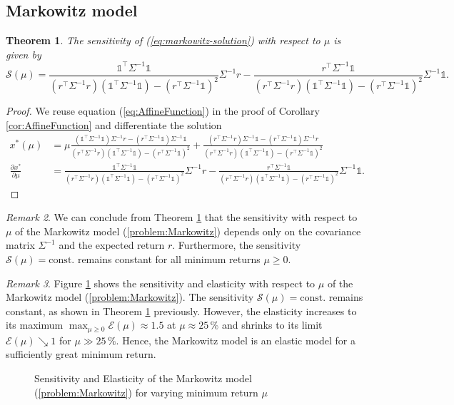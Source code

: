 \documentclass[a4paper, english, 11pt, onecolumn, oneside, final]{article}
\numberwithin{equation}{section}   %
\newcommand{\one}{\mathds 1}
\newcommand{\precision}{\Sigma^{-1}}
\newcommand{\A}{r^\top\Sigma^{-1} r}
\newcommand{\B}{r^\top\Sigma^{-1}\one}
\newcommand{\C}{\one^\top\Sigma^{-1}\one}
\newcommand{\D}{(\A)(\C)-(\B)^2}
\theoremstyle{plain}
\newtheorem{theorem}             {Theorem}[section]
\theoremstyle{definition}
\theoremstyle{remark}
\newtheorem{remark}     [theorem]{Remark}
\begin{document}
\subsection{Markowitz model}
\begin{theorem}
\label{thm:MarkowitzSensitivity}
    The sensitivity of (\ref{eq:markowitz-solution}) with respect to $\mu$ is given by
    \begin{equation*}
        \mathcal{S}(\mu) = \frac{\C}{\D}\precision r - \frac{\B}{\D}\precision\one.
    \end{equation*}
\end{theorem}
\begin{proof}
    We reuse equation (\ref{eq:AffineFunction}) in the proof of Corollary \ref{cor:AffineFunction} and differentiate the solution
    \begin{equation*}
        \begin{aligned}
            x^*(\mu) 
            &= \mu\frac{(\C)\precision r - (\B)\precision\one}{\D} + \frac{(\A)\precision\one - (\B)\precision r}{\D} \\
            \frac{\partial x^*}{\partial\mu}
            &= \frac{\C}{\D}\precision r - \frac{\B}{\D}\precision\one.
        \end{aligned}
    \end{equation*}
\end{proof}
\begin{remark}
    We can conclude from Theorem \ref{thm:MarkowitzSensitivity} that the sensitivity with respect to $\mu$ of the Markowitz model (\ref{problem:Markowitz}) depends only on the covariance matrix $\Sigma^{-1}$ and the expected return $r$. Furthermore, the sensitivity $\mathcal{S}(\mu)=\mathrm{const.}$ remains constant for all minimum returns $\mu\geq0$.
\end{remark}
\newpage
\begin{remark}
    Figure \ref{fig:plotSensitivityElasticityMarkowitz} shows the sensitivity and elasticity with respect to $\mu$ of the Markowitz model (\ref{problem:Markowitz}). The sensitivity $\mathcal{S}(\mu)=\text{const.}$ remains constant, as shown in Theorem \ref{thm:MarkowitzSensitivity} previously. However, the elasticity increases to its maximum $\max_{\mu\geq0}\mathcal{E}(\mu)\approx 1.5$ at $\mu\approx25\,\%$ and shrinks to its limit $\mathcal{E}(\mu)\searrow 1$ for $\mu\gg25\,\%$. Hence, the Markowitz model is an elastic model for a sufficiently great minimum return.
\end{remark}
\begin{figure}[h]
  \centering
  
  \caption{Sensitivity and Elasticity of the Markowitz model (\ref{problem:Markowitz}) for varying minimum return $\mu$}
  \label{fig:plotSensitivityElasticityMarkowitz}
\end{figure}
\end{document}
